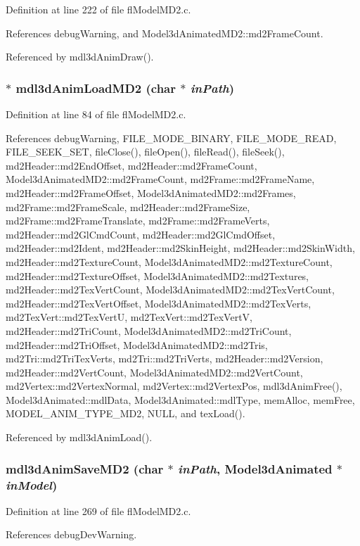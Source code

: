 Definition at line 222 of file fl\-Model\-MD2.c.

References debug\-Warning, and Model3d\-Animated\-MD2::md2Frame\-Count.

Referenced by mdl3d\-Anim\-Draw().
\subsubsection{$\ast$ mdl3d\-Anim\-Load\-MD2 (char $\ast$ {\em in\-Path})}\label{flModelMD2_8c_44cbc511d53f5bac06b5abea496f5c29}




Definition at line 84 of file fl\-Model\-MD2.c.

References debug\-Warning, FILE\_\-MODE\_\-BINARY, FILE\_\-MODE\_\-READ, FILE\_\-SEEK\_\-SET, file\-Close(), file\-Open(), file\-Read(), file\-Seek(), md2Header::md2End\-Offset, md2Header::md2Frame\-Count, Model3d\-Animated\-MD2::md2Frame\-Count, md2Frame::md2Frame\-Name, md2Header::md2Frame\-Offset, Model3d\-Animated\-MD2::md2Frames, md2Frame::md2Frame\-Scale, md2Header::md2Frame\-Size, md2Frame::md2Frame\-Translate, md2Frame::md2Frame\-Verts, md2Header::md2Gl\-Cmd\-Count, md2Header::md2Gl\-Cmd\-Offset, md2Header::md2Ident, md2Header::md2Skin\-Height, md2Header::md2Skin\-Width, md2Header::md2Texture\-Count, Model3d\-Animated\-MD2::md2Texture\-Count, md2Header::md2Texture\-Offset, Model3d\-Animated\-MD2::md2Textures, md2Header::md2Tex\-Vert\-Count, Model3d\-Animated\-MD2::md2Tex\-Vert\-Count, md2Header::md2Tex\-Vert\-Offset, Model3d\-Animated\-MD2::md2Tex\-Verts, md2Tex\-Vert::md2Tex\-Vert\-U, md2Tex\-Vert::md2Tex\-Vert\-V, md2Header::md2Tri\-Count, Model3d\-Animated\-MD2::md2Tri\-Count, md2Header::md2Tri\-Offset, Model3d\-Animated\-MD2::md2Tris, md2Tri::md2Tri\-Tex\-Verts, md2Tri::md2Tri\-Verts, md2Header::md2Version, md2Header::md2Vert\-Count, Model3d\-Animated\-MD2::md2Vert\-Count, md2Vertex::md2Vertex\-Normal, md2Vertex::md2Vertex\-Pos, mdl3d\-Anim\-Free(), Model3d\-Animated::mdl\-Data, Model3d\-Animated::mdl\-Type, mem\-Alloc, mem\-Free, MODEL\_\-ANIM\_\-TYPE\_\-MD2, NULL, and tex\-Load().

Referenced by mdl3d\-Anim\-Load().
\subsubsection{ mdl3d\-Anim\-Save\-MD2 (char $\ast$ {\em in\-Path}, {\bf Model3d\-Animated} $\ast$ {\em in\-Model})}\label{flModelMD2_8c_ea2d3e833bd2cf5916d1747a53e16012}




Definition at line 269 of file fl\-Model\-MD2.c.

References debug\-Dev\-Warning.